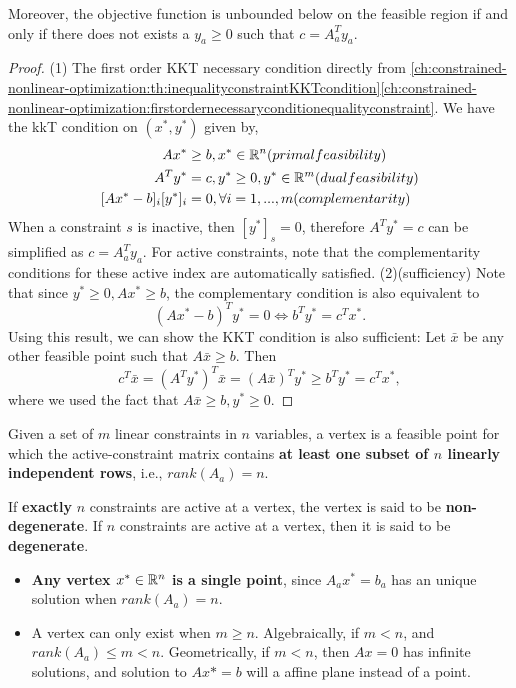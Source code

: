 \begin{refsection}
\begin{theorem}
Moreover, the objective function is unbounded below on the feasible region if and only if there does not exists a $y_a \geq 0$ such that $c = A^T_a y_a$. 
\end{theorem}
\begin{proof}
(1)
	The first order KKT necessary condition directly from \autoref{ch:constrained-nonlinear-optimization:th:inequalityconstraintKKTcondition}\autoref{ch:constrained-nonlinear-optimization:firstordernecessaryconditionequalityconstraint}. We have the kkT condition on $(x^*,y^*)$ given by,
\begin{align*}
Ax^* &\geq b, x^*\in \mathbb{R}^n (primal feasibility)\\
A^Ty^* &= c, y^*\geq 0, y^* \in \mathbb{R}^m (dual feasibility)\\
[Ax^* - b]_i[y^*]_i &= 0, \forall i=1,...,m (complementarity)
\end{align*}
When a constraint $s$ is inactive, then $[y^*]_s = 0$, therefore $A^Ty^* = c$ can be simplified as $c = A^T_ay_a$. For active constraints, note that the complementarity conditions for these active index are automatically satisfied.  
(2)(sufficiency)
Note that since $y^*\geq 0, Ax^*\geq b$, the complementary condition is also equivalent to $$(Ax^* - b)^Ty^* = 0 \Leftrightarrow b^Ty^* = c^Tx^*.$$ Using this result, we can show the KKT condition is also sufficient:
	Let $\bar{x}$ be any other feasible point such that $A\bar{x} \geq b$. Then
	$$c^T\bar{x} = (A^Ty^*)^T\bar{x} = (A\bar{x})^Ty^* \geq b^Ty^* = c^Tx^*,$$
where we used the fact that $A\bar{x} \geq b, y^*\geq 0$.
\end{proof}


\begin{definition}
Given a set of $m$ linear constraints in $n$ variables, a vertex is a feasible point for which the active-constraint matrix contains \textbf{at least one subset of $n$ linearly independent rows}, i.e., $rank(A_a) = n$.

If \textbf{exactly} $n$ constraints are active at a vertex, the vertex is said to be \textbf{non-degenerate}. If  $n$ constraints are active at a vertex, then it is said to be \textbf{degenerate}.
\end{definition}
\begin{remark}[interpretation]\hfill
\begin{itemize}
	\item \textbf{Any vertex $x^*\in\mathbb{R}^n$ is a single point}, since $A_a x^* = b_a$ has an unique solution when $rank(A_a) = n$.
	\item A vertex can only exist when $m\geq n$. Algebraically, if $m < n$, and $rank(A_a) \leq m < n$. Geometrically, if $m< n$, then $Ax = 0$ has infinite solutions, and solution to $Ax*=b$ will a affine plane instead of a point.
\end{itemize}
\end{remark}






\end{refsection}
